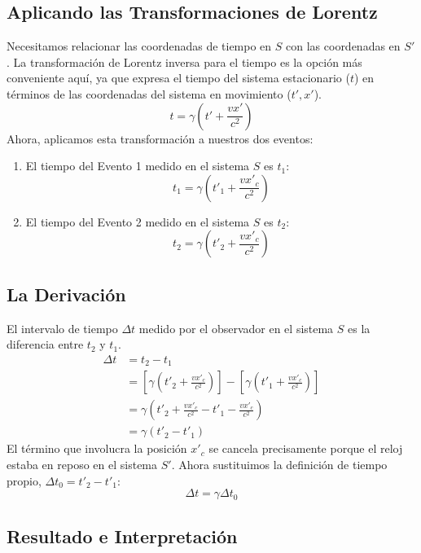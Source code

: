\documentclass[11pt,a4paper]{book}
\begin{document}
\subsection{Aplicando las Transformaciones de Lorentz}

Necesitamos relacionar las coordenadas de tiempo en $S$ con las coordenadas en $S'$. La transformación de Lorentz inversa para el tiempo es la opción más conveniente aquí, ya que expresa el tiempo del sistema estacionario ($t$) en términos de las coordenadas del sistema en movimiento ($t', x'$).
\[ t = \gamma \left( t' + \frac{vx'}{c^2} \right) \]
Ahora, aplicamos esta transformación a nuestros dos eventos:
\begin{enumerate}
    \item El tiempo del Evento 1 medido en el sistema $S$ es $t_1$:
    \[ t_1 = \gamma \left( t'_1 + \frac{vx'_c}{c^2} \right) \]
    \item El tiempo del Evento 2 medido en el sistema $S$ es $t_2$:
    \[ t_2 = \gamma \left( t'_2 + \frac{vx'_c}{c^2} \right) \]
\end{enumerate}

\subsection{La Derivación}

El intervalo de tiempo $\Delta t$ medido por el observador en el sistema $S$ es la diferencia entre $t_2$ y $t_1$.
\begin{align*}
\Delta t &= t_2 - t_1 \\
&= \left[ \gamma \left( t'_2 + \frac{vx'_c}{c^2} \right) \right] - \left[ \gamma \left( t'_1 + \frac{vx'_c}{c^2} \right) \right] \\
&= \gamma \left( t'_2 + \frac{vx'_c}{c^2} - t'_1 - \frac{vx'_c}{c^2} \right) \\
&= \gamma (t'_2 - t'_1)
\end{align*}
El término que involucra la posición $x'_c$ se cancela precisamente porque el reloj estaba en reposo en el sistema $S'$. Ahora sustituimos la definición de tiempo propio, $\Delta t_0 = t'_2 - t'_1$:
\[ \Delta t = \gamma \Delta t_0 \]

\subsection{Resultado e Interpretación}
\end{document}
